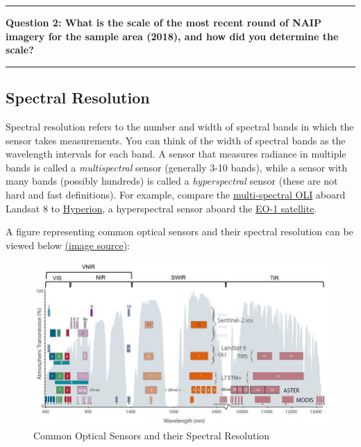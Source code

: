 \documentclass[
]{article}
\begin{document}
\begin{center}\rule{0.5\linewidth}{0.5pt}\end{center}

\textbf{Question 2: What is the scale of the most recent round of NAIP imagery for the sample area (2018), and how did you determine the scale?}

\begin{center}\rule{0.5\linewidth}{0.5pt}\end{center}

\hypertarget{spectral-resolution}{%
\subsection{Spectral Resolution}\label{spectral-resolution}}

Spectral resolution refers to the number and width of spectral bands in which the sensor takes measurements. You can think of the width of spectral bands as the wavelength intervals for each band. A sensor that measures radiance in multiple bands is called a \emph{multispectral} sensor (generally 3-10 bands), while a sensor with many bands (possibly hundreds) is called a \emph{hyperspectral} sensor (these are not hard and fast definitions). For example, compare the \href{http://landsat.gsfc.nasa.gov/?p=5779}{multi-spectral OLI} aboard Landsat 8 to \href{https://eo1.usgs.gov/sensors/hyperioncoverage}{Hyperion}, a hyperspectral sensor aboard the \href{https://eo1.usgs.gov/}{EO-1 satellite}.

A figure representing common optical sensors and their spectral resolution can be viewed below \href{https://www.researchgate.net/figure/Spectral-resolution-of-currently-available-optical-satellite-sensors-grouped-by-different_fig1_348695518}{(image source)}:

\begin{figure}

{\centering \includegraphics[width=1\linewidth]{./im/im_02_03} 

}

\caption{Common Optical Sensors and their Spectral Resolution}\label{fig:spectralres}
\end{figure}
\end{document}

